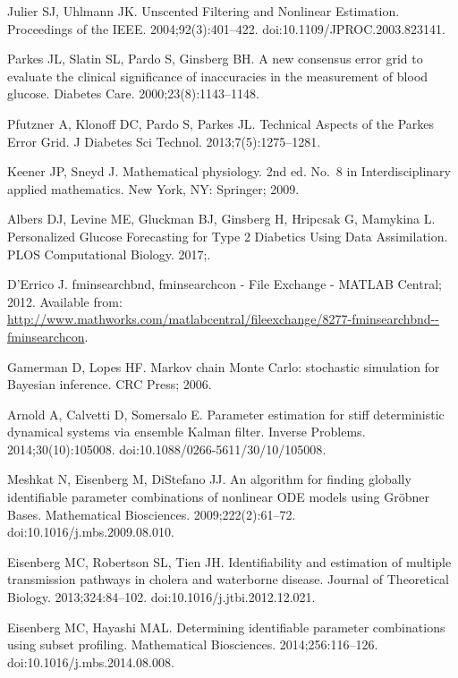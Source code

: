 \documentclass[10pt,letterpaper]{article}
\begin{document}
\begin{thebibliography}{10}
Julier SJ, Uhlmann JK.
\newblock Unscented {Filtering} and {Nonlinear} {Estimation}.
\newblock Proceedings of the IEEE. 2004;92(3):401--422.
\newblock doi:{10.1109/JPROC.2003.823141}.

Parkes JL, Slatin SL, Pardo S, Ginsberg BH.
\newblock A new consensus error grid to evaluate the clinical significance of
  inaccuracies in the measurement of blood glucose.
\newblock Diabetes Care. 2000;23(8):1143--1148.

Pfutzner A, Klonoff DC, Pardo S, Parkes JL.
\newblock Technical {Aspects} of the {Parkes} {Error} {Grid}.
\newblock J Diabetes Sci Technol. 2013;7(5):1275--1281.

Keener JP, Sneyd J.
\newblock Mathematical physiology.
\newblock 2nd ed. No.~8 in Interdisciplinary applied mathematics. New York, NY:
  Springer; 2009.

Albers DJ, Levine ME, Gluckman BJ, Ginsberg H, Hripcsak G, Mamykina L.
\newblock Personalized {Glucose} {Forecasting} for {Type} 2 {Diabetics} {Using}
  {Data} {Assimilation}.
\newblock PLOS Computational Biology. 2017;.

D'Errico J. fminsearchbnd, fminsearchcon - {File} {Exchange} - {MATLAB}
  {Central}; 2012.
\newblock Available from:
  \url{http://www.mathworks.com/matlabcentral/fileexchange/8277-fminsearchbnd--fminsearchcon}.

Gamerman D, Lopes HF.
\newblock Markov chain Monte Carlo: stochastic simulation for Bayesian
  inference.
\newblock CRC Press; 2006.

Arnold A, Calvetti D, Somersalo E.
\newblock Parameter estimation for stiff deterministic dynamical systems via
  ensemble {Kalman} filter.
\newblock Inverse Problems. 2014;30(10):105008.
\newblock doi:{10.1088/0266-5611/30/10/105008}.

Meshkat N, Eisenberg M, DiStefano JJ.
\newblock An algorithm for finding globally identifiable parameter combinations
  of nonlinear {ODE} models using {Gröbner} {Bases}.
\newblock Mathematical Biosciences. 2009;222(2):61--72.
\newblock doi:{10.1016/j.mbs.2009.08.010}.

Eisenberg MC, Robertson SL, Tien JH.
\newblock Identifiability and estimation of multiple transmission pathways in
  cholera and waterborne disease.
\newblock Journal of Theoretical Biology. 2013;324:84--102.
\newblock doi:{10.1016/j.jtbi.2012.12.021}.

Eisenberg MC, Hayashi MAL.
\newblock Determining identifiable parameter combinations using subset
  profiling.
\newblock Mathematical Biosciences. 2014;256:116--126.
\newblock doi:{10.1016/j.mbs.2014.08.008}.

\end{thebibliography}
\end{document}

